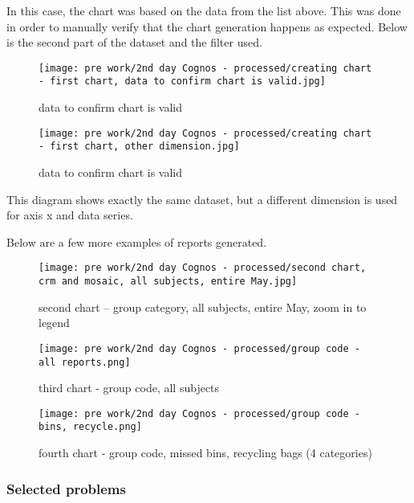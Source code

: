 In this case, the chart was based on the data from the list above. This was done in order to manually verify that the chart generation happens as expected. Below is the second part of the dataset and the filter used.

\begin{figure}[hp]
\centering
     \texttt{[image: pre work/2nd day Cognos - processed/creating chart - first chart, data to confirm chart is valid.jpg]}
      \caption{data to confirm chart is valid}
       \label{normal_case}
\end{figure}

\begin{figure}[hp]
\centering
     \texttt{[image: pre work/2nd day Cognos - processed/creating chart - first chart, other dimension.jpg]}
      \caption{data to confirm chart is valid}
       \label{normal_case}
\end{figure}

This diagram shows exactly the same dataset, but a different dimension is used for axis x and data series.

Below are a few more examples of reports generated.

\begin{figure}[hp]
\centering
     \texttt{[image: pre work/2nd day Cognos - processed/second chart, crm and mosaic, all subjects, entire May.jpg]}
      \caption{second chart – group category, all subjects, entire May, zoom in to legend}
       \label{normal_case}
\end{figure}


\begin{figure}[hp]
\centering
     \texttt{[image: pre work/2nd day Cognos - processed/group code - all reports.png]}
      \caption{third chart - group code, all subjects}
       \label{normal_case}
\end{figure}

\begin{figure}[hp]
\centering
     \texttt{[image: pre work/2nd day Cognos - processed/group code - bins, recycle.png]}
      \caption{fourth chart - group code, missed bins, recycling bags (4 categories)}
       \label{normal_case}
\end{figure}



			\subsubsection{Selected problems}
			
